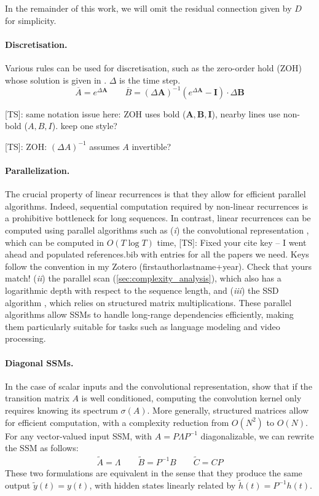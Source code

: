 \documentclass{article}
\newcommand{\TS}[1]{{\color{pink}[TS]: #1}}
\begin{document}
In the remainder of this work, we will omit the residual connection given by $D$ for simplicity.

\paragraph{Discretisation.} Various rules can be used for discretisation, such as the zero-order hold (ZOH) whose solution is given in . $\Delta$ is the time step.
\begin{equation}
\label{eq:zoh}
\overline{A} = e^{\Delta \bm{A}}
\qquad
\overline{B} = (\Delta \bm{A})^{-1} (e^{\Delta \bm{A}} - \bm{I}) \cdot \Delta \bm{B}
\end{equation}

\TS{same notation issue here: ZOH uses bold ($\bm A,\bm B,\bm I$), nearby lines use non-bold ($A,B,I$). keep one style?}

\TS{ZOH: $(\Delta A)^{-1}$ assumes $A$ invertible?}

\paragraph{Parallelization.} The crucial property of linear recurrences is that they allow for efficient parallel algorithms. Indeed, sequential computation required by non-linear recurrences is a prohibitive bottleneck for long sequences. In contrast, linear recurrences can be computed using parallel algorithms such as
%
(\emph{i}) the convolutional representation \citep{gu2022}, which can be computed in $O(T \log T)$ time,
\TS{Fixed your cite key -- I went ahead and populated references.bib with entries for all the papers we need. Keys follow the convention in my Zotero (firstauthorlastname+year). Check that yours match!}
%
(\emph{ii}) the parallel scan (\cref{sec:complexity_analysis}), which also has a logarithmic depth with respect to the sequence length, and
%
(\emph{iii}) the SSD algorithm \citep{dao2024}, which relies on structured matrix multiplications.
%
These parallel algorithms allow SSMs to handle long-range dependencies efficiently, making them particularly suitable for tasks such as language modeling and video processing.

\paragraph{Diagonal SSMs.} In the case of scalar inputs and the convolutional representation, \citet{gu2022s4d} show that if the transition matrix $A$ is well conditioned, computing the convolution kernel only requires knowing its spectrum $\sigma(A)$. More generally, structured matrices allow for efficient computation, with a complexity reduction from $O(N^2)$ to $O(N)$. For any vector-valued input SSM, with $A = P \Lambda P^{-1}$ diagonalizable, we can rewrite the SSM as follows:
%
\begin{align}
\label{eq:ssm:diagonal}
\widetilde{A} = \Lambda \qquad \widetilde{B} = P^{-1} B \qquad \widetilde{C} = C P
\end{align}
These two formulations are equivalent in the sense that they produce the same output $\widetilde{y}(t)=y(t)$, with hidden states linearly related by $\widetilde{h}(t) = P^{-1} h(t)$.
\end{document}
